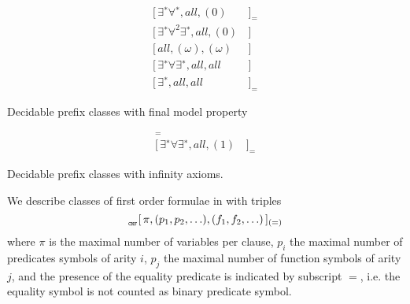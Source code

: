 \begin{table}[hbt]
\begin{align*}
[\,\exists^{∗}\forall^{∗}, all, (0)&\,]_{=} \tag{Bernays, Schönfinkel 1928, Ramsey 1932}
\\
[\,\exists^{∗}\forall^2\exists^{∗} , all, (0)&\,] \tag{Gödel 1932, Kalmár 1933, Schütte 1934}
\\
[\,all, (\omega), (\omega)&\,] \tag{Löb 1967, Gurevich 1969}
\\
[\,\exists^{∗}\forall\exists^{∗}, all, all&\,] \tag{Gurevich 1973}
\\
[\,\exists^{∗}, all, all&\,]_{=} \tag{Gurevich 1976}
\end{align*}
\caption[Decidable prefix classes]{Decidable prefix classes with final model property }
\label{tab:decidedable:FiniteModelProperty}
\end{table}

\begin{table}[hbt]
	\begin{align*}
	[\,all, (\omega), (1)&\,]_{=} \tag{Rabin 1969} 
	\\
	[\,\exists^{∗}\forall\exists^{∗}, all, (1)&\,]_{=} \tag{Shelah 1977}
	\end{align*}
	\caption[Decidable prefix classes]{Decidable prefix classes with infinity axioms. }
	\label{tab:decidable:InfinityAxioms}
\end{table}

\begin{definition}\label{def:prefix:class}
	We describe classes of first order formulae in \CNF with triples
	\[
	_{_\texttt{CNF}}[\, \pi, (p_1,p_2,\ldots), (f_1,f_2,\ldots)\,]_{(=)}
	\]
	where $\pi$ is the maximal number of variables per clause,
	$p_i$ the maximal number of predicates symbols of arity $i$,
	$p_j$ the maximal number of function symbols of arity $j$,
	and the presence of the equality predicate is indicated by subscript $=$,
	i.e. the equality symbol is not counted as binary predicate symbol.
\end{definition}

